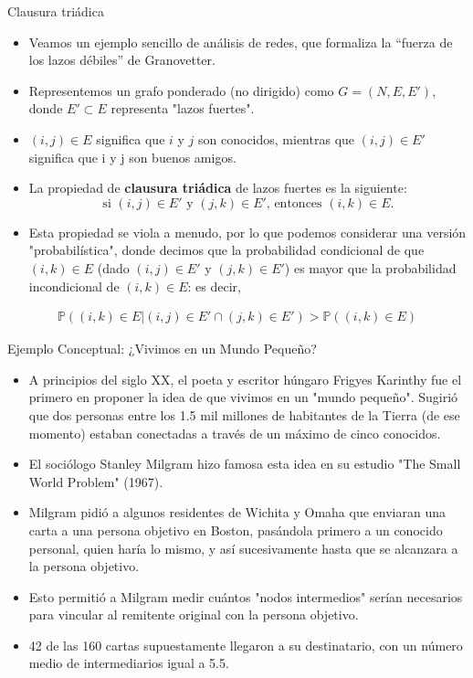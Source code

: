 \documentclass[11pt]{beamer}
\begin{document}
\begin{frame}{Clausura triádica}
    \begin{itemize}
\small        \item Veamos un ejemplo sencillo de análisis de redes, que formaliza la “fuerza de los lazos débiles” de Granovetter.
\item Representemos un grafo ponderado (no dirigido) como $G = (N,E,E')$, donde $E' \subset E$ representa "lazos fuertes".
\item $(i, j ) \in E$ significa que $i$ y $j$ son conocidos, mientras que $(i, j ) \in E'$ significa que i y j son buenos amigos.
\item La propiedad de \textbf{clausura triádica} de lazos fuertes es la siguiente:
\begin{equation*}
\text{si }(i, j) \in E'\text{ y }(j, k) \in E'\text{, entonces }(i, k ) \in E .
\end{equation*}
\item Esta propiedad se viola a menudo, por lo que podemos considerar una versión "probabilística", donde decimos que la probabilidad condicional de que $(i, k ) \in E $ (dado $(i, j) \in E'$ y $(j, k) \in E'$) es mayor que la probabilidad incondicional de $(i, k ) \in E $: es decir, 
    \end{itemize}
    \begin{equation*}
    \begin{split}
        \mathbb{P}((i, k) \in E | (i, j) \in E' \cap (j, k) \in E') > %
        \mathbb{P}((i, k) \in E)
        \end{split}
    \end{equation*}
\end{frame}

\begin{frame}{Ejemplo Conceptual: ¿Vivimos en un Mundo Pequeño?}
\begin{itemize}\small
  \item A principios del siglo XX, el poeta y escritor húngaro Frigyes Karinthy fue el primero en proponer la idea de que vivimos en un "mundo pequeño". Sugirió que dos personas entre los 1.5 mil millones de habitantes de la Tierra (de ese momento) estaban conectadas a través de un máximo de cinco conocidos.
  \item El sociólogo Stanley Milgram hizo famosa esta idea en su estudio "The Small World Problem" (1967).
  \item Milgram pidió a algunos residentes de Wichita y Omaha que enviaran una carta a una persona objetivo en Boston, pasándola primero a un conocido personal, quien haría lo mismo, y así sucesivamente hasta que se alcanzara a la persona objetivo.
  \item Esto permitió a Milgram medir cuántos "nodos intermedios" serían necesarios para vincular al remitente original con la persona objetivo.
  \item 42 de las 160 cartas supuestamente llegaron a su destinatario, con un número medio de intermediarios igual a 5.5.
\end{itemize}
\end{frame}
\end{document}
